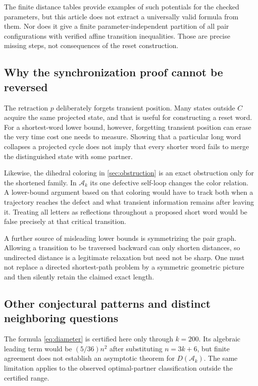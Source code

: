 \documentclass[11pt,a4paper]{article}
\numberwithin{equation}{section}
\theoremstyle{definition}
\theoremstyle{remark}
\newcommand{\Ak}{\mathcal A_k}
\begin{document}
The finite distance tables provide examples of such potentials for the
checked parameters, but this article does not extract a universally valid
formula from them. Nor does it give a finite parameter-independent partition
of all pair configurations with verified affine transition inequalities.
Those are precise missing steps, not consequences of the reset construction.

\subsection{Why the synchronization proof cannot be reversed}

The retraction $p$ deliberately forgets transient position. Many states
outside $C$ acquire the same projected state, and that is useful for
constructing a reset word. For a shortest-word lower bound, however,
forgetting transient position can erase the very time cost one needs to
measure. Showing that a particular long word collapses a projected cycle
does not imply that every shorter word fails to merge the distinguished
state with some partner.

Likewise, the dihedral coloring in \cref{sec:obstruction} is an exact
obstruction only for the shortened family. In $\Ak$ its one defective
self-loop changes the color relation. A lower-bound argument based on that
coloring would have to track both when a trajectory reaches the defect and
what transient information remains after leaving it. Treating all letters
as reflections throughout a proposed short word would be false precisely
at that critical transition.

A further source of misleading lower bounds is symmetrizing the pair graph.
Allowing a transition to be traversed backward can only shorten distances,
so undirected distance is a legitimate relaxation but need not be sharp.
One must not replace a directed shortest-path problem by a symmetric
geometric picture and then silently retain the claimed exact length.

\subsection{Other conjectural patterns and distinct neighboring questions}

The formula \eqref{eq:diameter} is certified here only through $k=200$.
Its algebraic leading term would be $(5/36)n^2$ after substituting
$n=3k+6$, but finite agreement does not establish an asymptotic theorem for
$D(\Ak)$. The same limitation applies to the observed optimal-partner
classification outside the certified range.
\end{document}
